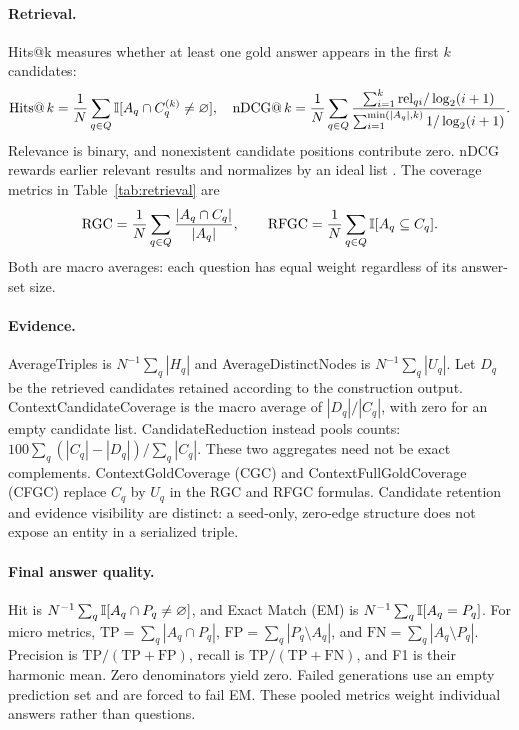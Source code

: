 \paragraph{Retrieval.}
Hits@k measures whether at least one gold answer appears in the first $k$ candidates:
\begin{equation}
 \operatorname{Hits@}k=\frac1N\sum_{q\in Q}\mathbb{I}[A_q\cap C_q^{(k)}\ne\varnothing],
 \quad
 \operatorname{nDCG@}k=\frac1N\sum_{q\in Q}
 \frac{\sum_{i=1}^{k}\mathrm{rel}_{qi}/\log_2(i+1)}
 {\sum_{i=1}^{\min(|A_q|,k)}1/\log_2(i+1)}.
\end{equation}
Relevance is binary, and nonexistent candidate positions contribute zero. nDCG rewards earlier relevant results and normalizes by an ideal list \citep{jarvelin2002cumulated}. The coverage metrics in Table~\ref{tab:retrieval} are
\begin{equation}
 \operatorname{RGC}=\frac1N\sum_{q\in Q}\frac{|A_q\cap C_q|}{|A_q|},
 \qquad
 \operatorname{RFGC}=\frac1N\sum_{q\in Q}\mathbb{I}[A_q\subseteq C_q].
\end{equation}
Both are macro averages: each question has equal weight regardless of its answer-set size.

\paragraph{Evidence.}
AverageTriples is $N^{-1}\sum_q|H_q|$ and AverageDistinctNodes is $N^{-1}\sum_q|U_q|$. Let $D_q$ be the retrieved candidates retained according to the construction output. ContextCandidateCoverage is the macro average of $|D_q|/|C_q|$, with zero for an empty candidate list. CandidateReduction instead pools counts: $100\sum_q(|C_q|-|D_q|)/\sum_q|C_q|$. These two aggregates need not be exact complements. ContextGoldCoverage (CGC) and ContextFullGoldCoverage (CFGC) replace $C_q$ by $U_q$ in the RGC and RFGC formulas. Candidate retention and evidence visibility are distinct: a seed-only, zero-edge structure does not expose an entity in a serialized triple.

\paragraph{Final answer quality.}
Hit is $N^{-1}\sum_q\mathbb{I}[A_q\cap P_q\ne\varnothing]$, and Exact Match (EM) is $N^{-1}\sum_q\mathbb{I}[A_q=P_q]$. For micro metrics, $\mathrm{TP}=\sum_q|A_q\cap P_q|$, $\mathrm{FP}=\sum_q|P_q\setminus A_q|$, and $\mathrm{FN}=\sum_q|A_q\setminus P_q|$. Precision is $\mathrm{TP}/(\mathrm{TP}+\mathrm{FP})$, recall is $\mathrm{TP}/(\mathrm{TP}+\mathrm{FN})$, and F1 is their harmonic mean. Zero denominators yield zero. Failed generations use an empty prediction set and are forced to fail EM. These pooled metrics weight individual answers rather than questions.

